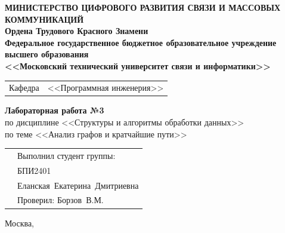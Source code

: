 \thispagestyle{empty}

\begin{center}
	\textbf{МИНИСТЕРСТВО ЦИФРОВОГО РАЗВИТИЯ СВЯЗИ И МАССОВЫХ КОММУНИКАЦИЙ} \\
	\textbf{Ордена Трудового Красного Знамени \\
		Федеральное государственное бюджетное образовательное учреждение высшего образования \\
		<<Московский технический университет связи и информатики>>}
\end{center}

\vspace{0.3em}

\begin{center}
	\begin{tabularx}{0.55\textwidth}{p{1.2cm}X}
		Кафедра & \quad <<Программная инженерия>> \\%
	\end{tabularx}
\end{center}

\vspace{12em}

\begin{center}
	\Large
	\textbf{Лабораторная работа №3} \\
	\large
	по дисциплине <<Структуры и алгоритмы обработки данных>> \\
	по теме <<Анализ графов и кратчайшие пути>>
\end{center}

\vspace{3em}

\renewcommand{\arraystretch}{1.1}
\begin{tabularx}{\textwidth}{p{8cm}p{7cm}}
	& Выполнил студент группы: \\
	& БПИ2401 \\
	& Еланская~Екатерина~Дмитриевна\\
	& Проверил: Борзов~В.М.\\
\end{tabularx}

\vspace{8em}

\begin{center}
	Москва,~\the\year
\end{center}
\clearpage

